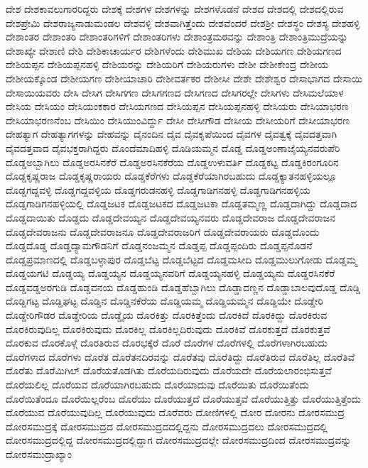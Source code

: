 {ದೇಶ
ದೇಶಕಾವಲುಗಾರರಿದ್ದರು
ದೇಶಕ್ಕೆ
ದೇಶಗಳ
ದೇಶಗಳನ್ನು
ದೇಶಗಳೊಡನೆ
ದೇಶದ
ದೇಶದಲ್ಲಿ
ದೇಶದಲ್ಲಿರುವ
ದೇಶಪ್ರೇಮಿ
ದೇಶರಾಜ್ಯನಾಡುಮಂಡಲ
ದೇಶವಳ್ಳಿ
ದೇಶವಾಗಿತ್ತೆಂದು
ದೇಶವೆಂದರೆ
ದೇಶಶ್ರೀ
ದೇಶಸ್ಥಂ
ದೇಶಸ್ಯ
ದೇಶಹಳ್ಳಿ
ದೇಶಾಂತರ
ದೇಶಾಂತರಿ
ದೇಶಾಂತರಿಗಳಿಗೆ
ದೇಶಾಂತರಿಗಳು
ದೇಶಾಂತ್ರಮಠವನ್ನು
ದೇಶಾಂತ್ರಿ
ದೇಶಾಂತ್ರಿಮುದ್ರೆಯನ್ನು
ದೇಶಾಖ್ಯೇ
ದೇಶಾಣಿ
ದೇಶಿ
ದೇಶಿಕಾಚಾರ್ಯರ
ದೇಶಿಗಳೆಂದು
ದೇಶಿಮುಖ
ದೇಶಿಯ
ದೇಶಿಯಗಣ
ದೇಶಿಯಗಣದ
ದೇಶಿಯಪ್ಪನ
ದೇಶಿಯಪ್ಪನಹಳ್ಳಿ
ದೇಶಿಯರನ್ನು
ದೇಶಿಯರಿಗೆ
ದೇಶಿಯರುಗಳು
ದೇಶೀ
ದೇಶೀಕೇಂದ್ರ
ದೇಶೀಯ
ದೇಶೀಯಕ್ಕೊಂಡ
ದೇಶೀಯಗಣ
ದೇಶೀಯಾಚಾರಿ
ದೇಶೀವರ್ತಕರ
ದೇಶೀಸೀ
ದೇಶೇ
ದೇಶೇಶ್ವರ
ದೇಸಾಭಾಗದ
ದೇಸಾಯಿ
ದೇಸಾಯಿಯವರು
ದೇಸಿ
ದೇಸಿಗ
ದೇಸಿಗಗಣ
ದೇಸಿಗಗಣದ
ದೇಸಿಗಣದ
ದೇಸಿಗರಲ್ಲೇ
ದೇಸಿಗಳು
ದೇಸಿಮಲೆಯಾಳ
ದೇಸಿಯ
ದೇಸಿಯಂ
ದೇಸಿಯಂಕಕಾರ
ದೇಸಿಯಗಣದ
ದೇಸಿಯಪ್ಪನ
ದೇಸಿಯಪ್ಪನಹಳ್ಳಿ
ದೇಸಿಯರು
ದೇಸಿಯಾಭರಣ
ದೇಸಿಯಾಭರಣನೆಂಬ
ದೇಸಿಯಿಂ
ದೇಸಿಯುಂವಿರ್ದ್ದು
ದೇಸೀ
ದೇಸೀಗೌಡ
ದೇಸೀಯ
ದೇಸೀಯರಿಗೆ
ದೇಸೀಯಾಭರಣ
ದೇಹತ್ಯಾಗ
ದೇಹತ್ಯಾಗಗಳನ್ನು
ದೇಹವನ್ನು
ದೈನಂದಿನ
ದೈವ
ದೈವಕೃಪೆಯಿಂದ
ದೈವಗಳ
ದೈವತ್ವಕ್ಕೆ
ದೈವದತ್ತವಾಗಿ
ದೈವದತ್ತವಾದ
ದೈವಭಕ್ತರಾಗಿದ್ದರು
ದೊಂದೆಮಾದಿಹಳ್ಳಿ
ದೊಡಿಯಮ್ಮನ
ದೊಡ್ಡ
ದೊಡ್ಡಅಂಣಾಜೈಯ್ಯನವರುಪೆರಿ
ದೊಡ್ಡಅಬ್ಬಾಗಿಲು
ದೊಡ್ಡಅರಸಿನಕೆರೆ
ದೊಡ್ಡಅರಸಿನಕೆರೆಯ
ದೊಡ್ಡಉಳುವರ್ತಿ
ದೊಡ್ಡಕಟ್ಟ
ದೊಡ್ಡಕಿರಂಗೂರಿನ
ದೊಡ್ಡಕೃಷ್ಣರಾಜ
ದೊಡ್ಡಕೃಷ್ಣರಾಯರು
ದೊಡ್ಡಕೆರೆಗಳು
ದೊಡ್ಡಕೆರೆಯಾಗಿರಬಹುದು
ದೊಡ್ಡಕ್ಯಾತನಹಳ್ಳಿಯಲ್ಲೂ
ದೊಡ್ಡಗದ್ದವಳ್ಳಿ
ದೊಡ್ಡಗದ್ದವಳ್ಳಿಯ
ದೊಡ್ಡಗರುಡನಹಳ್ಳಿ
ದೊಡ್ಡಗಾಡಿಗನಹಳ್ಳಿ
ದೊಡ್ಡಗಾಡಿಗನಹಳ್ಳಿಯ
ದೊಡ್ಡಗಾಡಿಗನಹಳ್ಳಿಯಲ್ಲಿ
ದೊಡ್ಡಜಟಕ
ದೊಡ್ಡಜಟಕದ
ದೊಡ್ಡಜಟಕಾ
ದೊಡ್ಡತಮ್ಮಣ್ಣ
ದೊಡ್ಡದಾಗಿದ್ದು
ದೊಡ್ಡದಾದ
ದೊಡ್ಡದಾಯಿತು
ದೊಡ್ಡದು
ದೊಡ್ಡದೇವಯ್ಯನ
ದೊಡ್ಡದೇವಯ್ಯನವರು
ದೊಡ್ಡದೇವರಾಜ
ದೊಡ್ಡದೇವರಾಜನ
ದೊಡ್ಡದೇವರಾಜನು
ದೊಡ್ಡದೇವರಾಜನೂ
ದೊಡ್ಡದೇವರಾಜರಿಗೆ
ದೊಡ್ಡದೇವರಾಯರು
ದೊಡ್ಡದೊಂದು
ದೊಡ್ಡದೊಡ್ಡ
ದೊಡ್ಡದ್ಯಾಮಗೌಡನಿಗೆ
ದೊಡ್ಡನಂಜಮ್ಮನ
ದೊಡ್ಡಪ್ಪ
ದೊಡ್ಡಪ್ಪಂದಿರು
ದೊಡ್ಡಪ್ಪನೊಡನೆ
ದೊಡ್ಡಪ್ರಮಾಣದಲ್ಲಿ
ದೊಡ್ಡಬಳ್ಳಾಪುರ
ದೊಡ್ಡಬೆಟ್ಟ
ದೊಡ್ಡಬೆಟ್ಟದ
ದೊಡ್ಡಮಸೀದಿ
ದೊಡ್ಡಮುಲುಗೋಡು
ದೊಡ್ಡಮ್ಮ
ದೊಡ್ಡಯಗಟಿ
ದೊಡ್ಡಯ್ಯ
ದೊಡ್ಡಯ್ಯನ
ದೊಡ್ಡಯ್ಯನವರಿಗೆ
ದೊಡ್ಡಯ್ಯನಹಳ್ಳಿ
ದೊಡ್ಡಯ್ಯನು
ದೊಡ್ಡರಸಿನಕೆರೆ
ದೊಡ್ಡವಡ್ಡಅರಗುಡಿ
ದೊಡ್ಡವನಯ
ದೊಡ್ಡಹುಂಡಿ
ದೊಡ್ಡಹೆಬ್ಬಾಗಿಲು
ದೊಡ್ಡಾದಣ್ಣನ
ದೊಡ್ಡಾಬಾಲವುದೊಡ್ಡ
ದೊಡ್ಡಿ
ದೊಡ್ಡಿಗಟ್ಟ
ದೊಡ್ಡಿಘಟ್ಟ
ದೊಡ್ಡಿನ
ದೊಡ್ಡಿನಕೆರೆಯ
ದೊಡ್ಡಿಯಮ್ಮ
ದೊಡ್ಡಿಯಮ್ಮನ
ದೊಡ್ಡಿಯೇ
ದೊಡ್ಡೇರಿ
ದೊಡ್ಡೇರಿಗೌಡರ
ದೊಡ್ಡೇರಿಯ
ದೊಡ್ಡೈಯ
ದೊರಕಿತ್ತು
ದೊರಕಿತ್ತೆಂದು
ದೊರಕಿದೆ
ದೊರಕಿದ್ದು
ದೊರಕಿರುವ
ದೊರಕಿರುವುದಿಲ್ಲ
ದೊರಕಿರುವುದು
ದೊರಕಿಲ್ಲ
ದೊರಕಿಲ್ಲದಿರುವುದು
ದೊರಕಿವೆ
ದೊರಕುತ್ತದೆ
ದೊರಕುತ್ತವೆ
ದೊರಕುವ
ದೊರಕೊಳ್ಗೆ
ದೊರತಿರುವ
ದೊರಭಕ್ಕೆರೆ
ದೊರೆ
ದೊರೆಗಳ
ದೊರೆಗಳಲ್ಲಿ
ದೊರೆಗಳಾಗಿರಬಹುದು
ದೊರೆಗಳಾದ
ದೊರೆಗಳು
ದೊರೆತ
ದೊರೆತನದಿರವನ್ನು
ದೊರೆತವು
ದೊರೆತಿದ್ದು
ದೊರೆತಿರುವ
ದೊರೆತಿಲ್ಲ
ದೊರೆತಿವೆ
ದೊರೆತು
ದೊರೆಮಿಗಿಲ್
ದೊರೆಯತೊಡಗಿತು
ದೊರೆಯದಿರುವುದು
ದೊರೆಯದೇ
ದೊರೆಯಲಾರಂಭಿಸುತ್ತವೆ
ದೊರೆಯಲಿಲ್ಲ
ದೊರೆಯವ
ದೊರೆಯಾಗಿರಬಹುದು
ದೊರೆಯಾದುವು
ದೊರೆಯಿತು
ದೊರೆಯಿತೆಂದು
ದೊರೆಯಿತೆಂದೂ
ದೊರೆಯಿಲ್ಲರೆಂಬ
ದೊರೆಯು
ದೊರೆಯುತ್ತದೆ
ದೊರೆಯುತ್ತವೆ
ದೊರೆಯುತ್ತಿತ್ತು
ದೊರೆಯುತ್ತಿತ್ತೆಂದು
ದೊರೆಯುವ
ದೊರೆಯುವುದಿಲ್ಲ
ದೊರೆಯುವುದು
ದೊರೆವರು
ದೋಣಿಗಳಲ್ಲಿ
ದೋರ
ದೋರನು
ದೋರಸಮುದ್ರ
ದೋರಸಮುದ್ರಕ್ಕೆ
ದೋರಸಮುದ್ರದ
ದೋರಸಮುದ್ರದದಲ್ಲಿದ್ದನು
ದೋರಸಮುದ್ರದಲು
ದೋರಸಮುದ್ರದಲ್ಲಿ
ದೋರಸಮುದ್ರದಲ್ಲಿದ್ದ
ದೋರಸಮುದ್ರದಲ್ಲಿದ್ದಾಗ
ದೋರಸಮುದ್ರದಲ್ಲೇ
ದೋರಸಮುದ್ರದಿಂದ
ದೋರಸಮುದ್ರವನ್ನು
ದೋರಸಮುದ್ರಾಖ್ಯಾಂ
}
